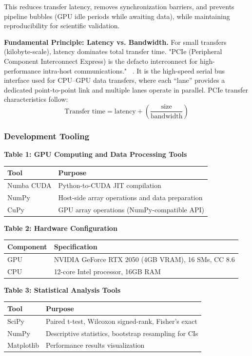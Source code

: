 This reduces transfer latency, removes synchronization barriers, and prevents pipeline bubbles (GPU idle periods while awaiting data), while maintaining reproducibility for scientific validation.

\textbf{Fundamental Principle: Latency vs. Bandwidth.} For small transfers (kilobyte-scale), latency dominates total transfer time. "PCIe (Peripheral Component Interconnect Express) is the
defacto interconnect for high-performance intra-host communications." ~\cite{hou2024pcie}. It is the high-speed serial bus interface used for CPU--GPU data transfers, where each ``lane'' provides a dedicated point-to-point link and multiple lanes operate in parallel. PCIe transfer characteristics follow:
\[
\text{Transfer time} = \text{latency} + \left(\frac{\text{size}}{\text{bandwidth}}\right)
\]

\subsubsection*{Development Tooling}

\begin{center}
\textbf{Table 1: GPU Computing and Data Processing Tools}\\[0.5em]
\begin{tabular}{@{}ll@{}}
\toprule
\textbf{Tool} & \textbf{Purpose} \\
\midrule
Numba CUDA & Python-to-CUDA JIT compilation \\
NumPy & Host-side array operations and data preparation \\
CuPy & GPU array operations (NumPy-compatible API) \\
\bottomrule
\end{tabular}
\end{center}

\begin{center}
\textbf{Table 2: Hardware Configuration}\\[0.5em]
\begin{tabular}{@{}ll@{}}
\toprule
\textbf{Component} & \textbf{Specification} \\
\midrule
GPU & NVIDIA GeForce RTX 2050 (4GB VRAM), 16 SMs, CC 8.6 \\
CPU & 12-core Intel processor, 16GB RAM \\
\bottomrule
\end{tabular}
\end{center}

\begin{center}
\textbf{Table 3: Statistical Analysis Tools}\\[0.5em]
\small
\begin{tabular}{@{}ll@{}}
\toprule
\textbf{Tool} & \textbf{Purpose} \\
\midrule
SciPy & Paired t-test, Wilcoxon signed-rank, Fisher's exact \\
NumPy & Descriptive statistics, bootstrap resampling for CIs \\
Matplotlib & Performance results visualization \\
\bottomrule
\end{tabular}
\end{center}

